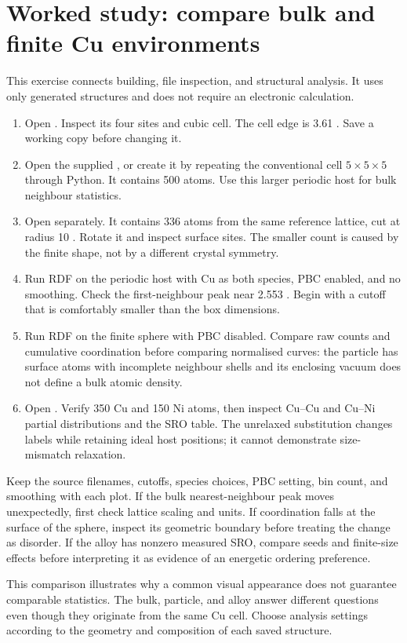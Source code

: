 \section{Worked study: compare bulk and finite Cu environments}
This exercise connects building, file inspection, and structural analysis. It uses only generated structures and does not require an electronic calculation.
\begin{enumerate}
\item Open . Inspect its four sites and cubic cell. The cell edge is 3.61 \angstrom. Save a working copy before changing it.
\item Open the supplied , or create it by repeating the conventional cell $5\times5\times5$ through Python. It contains 500 atoms. Use this larger periodic host for bulk neighbour statistics.
\item Open  separately. It contains 336 atoms from the same reference lattice, cut at radius 10 \angstrom. Rotate it and inspect surface sites. The smaller count is caused by the finite shape, not by a different crystal symmetry.
\item Run RDF on the periodic host with Cu as both species, PBC enabled, and no smoothing. Check the first-neighbour peak near 2.553 \angstrom. Begin with a cutoff that is comfortably smaller than the box dimensions.
\item Run RDF on the finite sphere with PBC disabled. Compare raw counts and cumulative coordination before comparing normalised curves: the particle has surface atoms with incomplete neighbour shells and its enclosing vacuum does not define a bulk atomic density.
\item Open . Verify 350 Cu and 150 Ni atoms, then inspect Cu--Cu and Cu--Ni partial distributions and the SRO table. The unrelaxed substitution changes labels while retaining ideal host positions; it cannot demonstrate size-mismatch relaxation.
\end{enumerate}
Keep the source filenames, cutoffs, species choices, PBC setting, bin count, and smoothing with each plot. If the bulk nearest-neighbour peak moves unexpectedly, first check lattice scaling and units. If coordination falls at the surface of the sphere, inspect its geometric boundary before treating the change as disorder. If the alloy has nonzero measured SRO, compare seeds and finite-size effects before interpreting it as evidence of an energetic ordering preference.

This comparison illustrates why a common visual appearance does not guarantee comparable statistics. The bulk, particle, and alloy answer different questions even though they originate from the same Cu cell. Choose analysis settings according to the geometry and composition of each saved structure.
